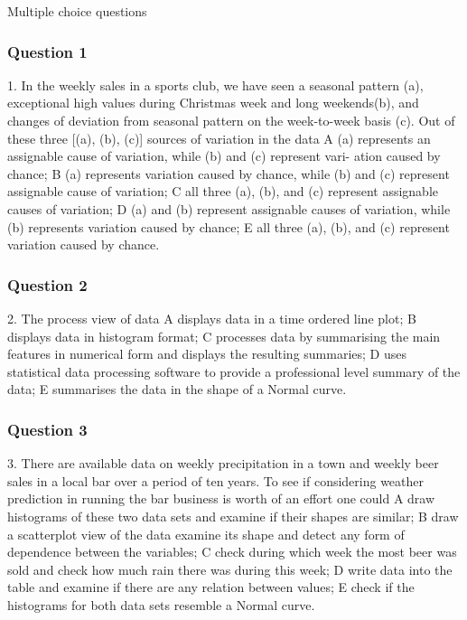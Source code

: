 Multiple choice questions

\subsubsection*{Question 1}
1. In the weekly sales in a sports club, we have seen a seasonal pattern (a), exceptional
high values during Christmas week and long weekends(b), and changes of deviation
from seasonal pattern on the week-to-week basis (c). Out of these three [(a), (b),
(c)] sources of variation in the data
A (a) represents an assignable cause of variation, while (b) and (c) represent vari-
ation caused by chance;
B (a) represents variation caused by chance, while (b) and (c) represent assignable
cause of variation;
C all three (a), (b), and (c) represent assignable causes of variation;
D (a) and (b) represent assignable causes of variation, while (b) represents variation
caused by chance;
E all three (a), (b), and (c) represent variation caused by chance.

\subsubsection*{Question 2}
2. The process view of data
A displays data in a time ordered line plot;
B displays data in histogram format;
C processes data by summarising the main features in numerical form and displays
the resulting summaries;
D uses statistical data processing software to provide a professional level summary
of the data;
E summarises the data in the shape of a Normal curve.
\subsubsection*{Question 3}
3. There are available data on weekly precipitation in a town and weekly beer sales in
a local bar over a period of ten years. To see if considering weather prediction in
running the bar business is worth of an effort one could
A draw histograms of these two data sets and examine if their shapes are similar;
B draw a scatterplot view of the data examine its shape and detect any form of
dependence between the variables;
C check during which week the most beer was sold and check how much rain there
was during this week;
D write data into the table and examine if there are any relation between values;
E check if the histograms for both data sets resemble a Normal curve.

